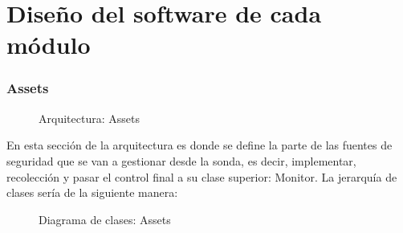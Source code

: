 \section{Diseño del software de cada módulo}

\subsubsection{Assets}

\begin{figure}[H]
  \caption{Arquitectura: Assets}
\end{figure}

En esta sección de la arquitectura es donde se define la parte de las fuentes de seguridad que se van a gestionar desde la sonda, es decir, implementar, recolección y pasar el control final a su clase superior: Monitor. La jerarquía de clases sería de la siguiente manera:\\
\newpage
\begin{figure}
  \caption{Diagrama de clases: Assets}
\end{figure}

